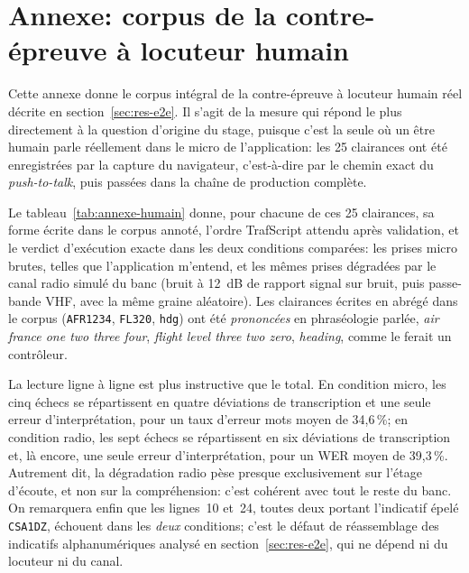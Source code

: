 \section{Annexe: corpus de la contre-épreuve à locuteur humain}
\label{sec:annexe-humain}

Cette annexe donne le corpus intégral de la contre-épreuve à locuteur humain réel décrite en
section~\ref{sec:res-e2e}. Il s'agit de la mesure qui répond le plus directement à la question
d'origine du stage, puisque c'est la seule où un être humain parle réellement dans le micro de
l'application: les 25 clairances ont été enregistrées par la capture du navigateur,
c'est-à-dire par le chemin exact du \emph{push-to-talk}, puis passées dans la chaîne de
production complète.

Le tableau~\ref{tab:annexe-humain} donne, pour chacune de ces 25 clairances, sa forme écrite
dans le corpus annoté, l'ordre TrafScript attendu après validation, et le verdict d'exécution
exacte dans les deux conditions comparées: les prises micro brutes, telles que l'application
m'entend, et les mêmes prises dégradées par le canal radio simulé du banc (bruit à 12~dB de
rapport signal sur bruit, puis passe-bande VHF, avec la même graine aléatoire). Les clairances
écrites en abrégé dans le corpus (\texttt{AFR1234}, \texttt{FL320}, \texttt{hdg}) ont été
\emph{prononcées} en phraséologie parlée, \emph{air france one two three four},
\emph{flight level three two zero}, \emph{heading}, comme le ferait un contrôleur. 

La lecture ligne à ligne est plus instructive que le total. En condition micro, les cinq
échecs se répartissent en quatre déviations de transcription et une seule erreur
d'interprétation, pour un taux d'erreur mots moyen de 34,6\,\%; en condition radio, les sept
échecs se répartissent en six déviations de transcription et, là encore, une seule erreur
d'interprétation, pour un WER moyen de 39,3\,\%. Autrement dit, la dégradation radio pèse
presque exclusivement sur l'étage d'écoute, et non sur la compréhension: c'est cohérent avec
tout le reste du banc. On remarquera enfin que les lignes~10 et~24, toutes deux portant
l'indicatif épelé \texttt{CSA1DZ}, échouent dans les \emph{deux} conditions; c'est le défaut
de réassemblage des indicatifs alphanumériques analysé en section~\ref{sec:res-e2e}, qui ne
dépend ni du locuteur ni du canal.

